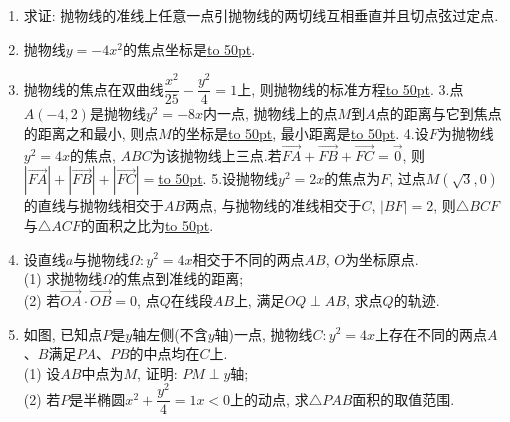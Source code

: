 \documentclass[10pt,a4paper]{article}
\newcommand{\blank}[1]{\underline{\hbox to #1pt{}}}
\begin{document}
\begin{enumerate}[1.]
\begin{center}
\end{center}
\item 求证: 抛物线的准线上任意一点引抛物线的两切线互相垂直并且切点弦过定点.
\item 抛物线$y=-4x^2$的焦点坐标是\blank{50}.
\item 抛物线的焦点在双曲线$\dfrac{x^2}{25}-\dfrac{y^2}4=1$上, 则抛物线的标准方程\blank{50}.
3.点$A(-4,2)$是抛物线$y^2=-8x$内一点, 抛物线上的点$M$到$A$点的距离与它到焦点的距离之和最小, 则点$M$的坐标是\blank{50}, 最小距离是\blank{50}.
4.设$F$为抛物线$y^2=4x$的焦点, $ABC$为该抛物线上三点.若$\overrightarrow{FA}+\overrightarrow{FB}+\overrightarrow{FC}=\overrightarrow 0$, 则$|\overrightarrow{FA}|+|\overrightarrow{FB}|+|\overrightarrow{FC}|=$\blank{50}.
5.设抛物线$y^2=2x$的焦点为$F$, 过点$M(\sqrt 3,0)$的直线与抛物线相交于$AB$两点, 与抛物线的准线相交于$C$, $| BF |=2$, 则$\triangle BCF$与$\triangle ACF$的面积之比为\blank{50}.
\item 设直线$a$与抛物线$\Omega:y^2=4x$相交于不同的两点$AB$, $O$为坐标原点.\\
(1) 求抛物线$\Omega$的焦点到准线的距离;\\
(2) 若$\overrightarrow{OA}\cdot \overrightarrow{OB}=0$, 点$Q$在线段$AB$上, 满足$OQ\perp AB$, 求点$Q$的轨迹.
\item 如图, 已知点$P$是$y$轴左侧(不含$y$轴)一点, 抛物线$C:y^2=4x$上存在不同的两点$A$、$B$满足$PA$、$PB$的中点均在$C$上.\\
(1) 设$AB$中点为$M$, 证明: $PM\perp y$轴;\\
(2) 若$P$是半椭圆${x^2}+\dfrac{y^2}4=1x<0$上的动点, 求$\triangle PAB$面积的取值范围.
\begin{center}
\end{center}


\end{enumerate}
\end{document}
